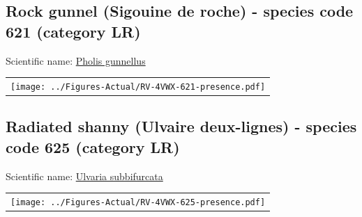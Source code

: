 \documentclass[12pt]{article}\usepackage[]{graphicx}\usepackage[]{color}
\begin{document}
\renewcommand\thefigure{\thesubsection\Alph{figure}}

\setcounter{figure}{0}

\hypertarget{sec:621}{%
\subsection{Rock gunnel (Sigouine de roche) - species code 621 (category LR)}\label{sec:621}}

  


Scientific name: \href{http://www.marinespecies.org/aphia.php?p=taxdetails\&id=126996}{Pholis gunnellus} \newline
\begin{minipage}{1.0\textwidth}
 \begin{tabular}{c}
\texttt{[image: ../Figures-Actual/RV-4VWX-621-presence.pdf]} \\ 
\end{tabular} 
\end{minipage}
\clearpage

\renewcommand\thefigure{\thesubsection\Alph{figure}}

\setcounter{figure}{0}

\hypertarget{sec:625}{%
\subsection{Radiated shanny (Ulvaire deux-lignes) - species code 625 (category LR)}\label{sec:625}}

  


Scientific name: \href{http://www.marinespecies.org/aphia.php?p=taxdetails\&id=159821}{Ulvaria subbifurcata} \newline
\begin{minipage}{1.0\textwidth}
 \begin{tabular}{c}
\texttt{[image: ../Figures-Actual/RV-4VWX-625-presence.pdf]} \\ 
\end{tabular} 
\end{minipage}
\clearpage

\renewcommand\thefigure{\thesubsection\Alph{figure}}
\end{document}
